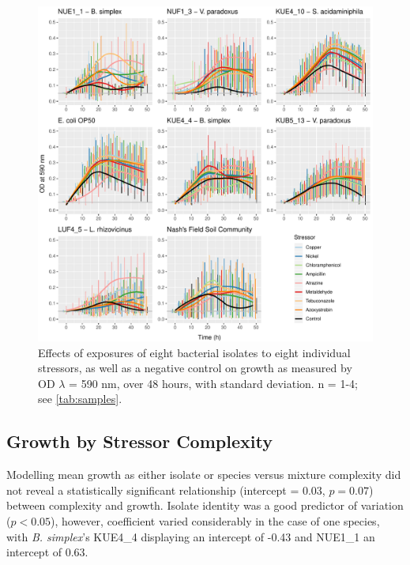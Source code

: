 \documentclass[10pt]{article}
\begin{document}
\begin{figure}[H]
    \centering
    \includegraphics[width = \textwidth]{Scripts/Results/Final_Pipeline/single_stressor_plots.pdf}
    \caption{Effects of exposures of eight bacterial isolates to eight individual stressors, as well as a negative control on growth as measured by OD $\lambda$ = 590 nm, over 48 hours, with standard deviation. n = 1-4; see \cref{tab:samples}.}
    \label{fig:sstress}
\end{figure}

\newpage
\subsection{Growth by Stressor Complexity}
\label{S:3:4}

Modelling mean growth as either isolate or species versus mixture complexity did not reveal a statistically significant relationship (intercept = 0.03, $p = 0.07$) between complexity and growth. Isolate identity was a good predictor of variation ($p < 0.05$), however, coefficient varied considerably in the case of one species, with \textit{B. simplex}'s KUE4\_4 displaying an intercept of -0.43 and NUE1\_1 an intercept of 0.63. 
\end{document}

